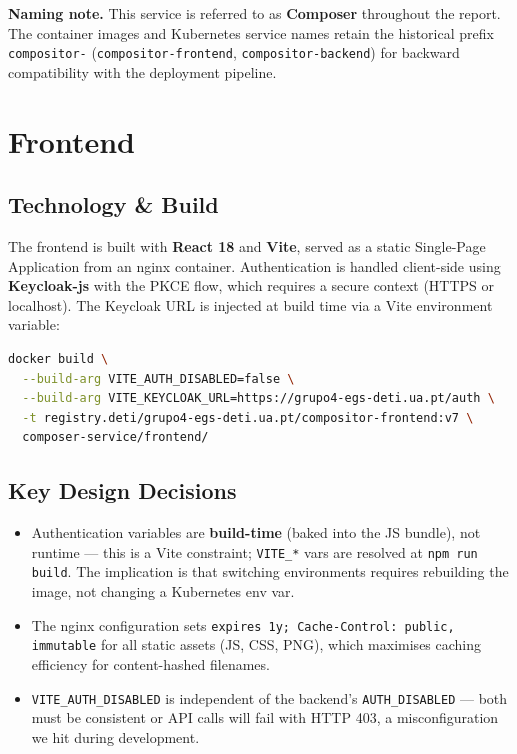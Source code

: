 \documentclass[12pt,a4paper,oneside]{report}
\begin{document}
\begin{callout}
\textbf{Naming note.} This service is referred to as \textbf{Composer} throughout the report. The container images and Kubernetes service names retain the historical prefix \texttt{compositor-} (\texttt{compositor-frontend}, \texttt{compositor-backend}) for backward compatibility with the deployment pipeline.
\end{callout}

\section{Frontend}

\subsection{Technology \& Build}

The frontend is built with \textbf{React 18} and \textbf{Vite}, served as a static Single-Page Application from an nginx container. Authentication is handled client-side using \textbf{Keycloak-js} with the PKCE flow, which requires a secure context (HTTPS or localhost). The Keycloak URL is injected at build time via a Vite environment variable:

\begin{lstlisting}[language=bash, caption=Frontend Docker build arguments]
docker build \
  --build-arg VITE_AUTH_DISABLED=false \
  --build-arg VITE_KEYCLOAK_URL=https://grupo4-egs-deti.ua.pt/auth \
  -t registry.deti/grupo4-egs-deti.ua.pt/compositor-frontend:v7 \
  composer-service/frontend/
\end{lstlisting}

\subsection{Key Design Decisions}

\begin{itemize}[noitemsep]
  \item Authentication variables are \textbf{build-time} (baked into the JS bundle), not runtime — this is a Vite constraint; \texttt{VITE\_*} vars are resolved at \texttt{npm run build}. The implication is that switching environments requires rebuilding the image, not changing a Kubernetes env var.
  \item The nginx configuration sets \texttt{expires 1y; Cache-Control: public, immutable} for all static assets (JS, CSS, PNG), which maximises caching efficiency for content-hashed filenames.
  \item \texttt{VITE\_AUTH\_DISABLED} is independent of the backend's \texttt{AUTH\_DISABLED} — both must be consistent or API calls will fail with HTTP 403, a misconfiguration we hit during development.
\end{itemize}
\end{document}
